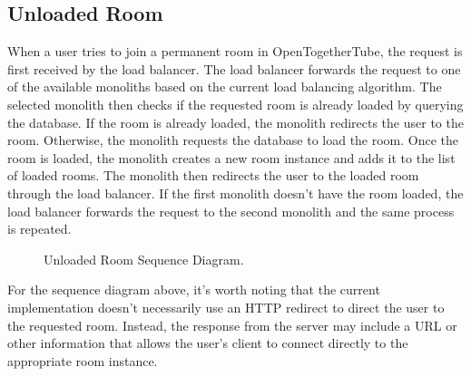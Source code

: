 \subsection{Unloaded Room}
When a user tries to join a permanent room in OpenTogetherTube, the request is first received by the load balancer. 
The load balancer forwards the request to one of the available monoliths based on the current load
balancing algorithm. The selected monolith then checks if the requested room is already loaded by querying the database. 
If the room is already loaded, the monolith redirects the user to the room. Otherwise, the monolith requests the database to 
load the room. Once the room is loaded, the monolith creates a new room instance and adds it to the list of loaded rooms. 
The monolith then redirects the user to the loaded room through the load balancer. If the first monolith doesn't have the
room loaded, the load balancer forwards the request to the second monolith and the same process is repeated.

 \begin{figure}[!htb]
  \centering
  \caption{\label{Figure::unloaded-room} Unloaded Room Sequence Diagram.}
\end{figure}

For the sequence diagram above, it's worth noting that the current implementation doesn't necessarily use an HTTP 
redirect to direct the user to the requested room. Instead, the response from the server may include a URL or other
information that allows the user's client to connect directly to the appropriate room instance.